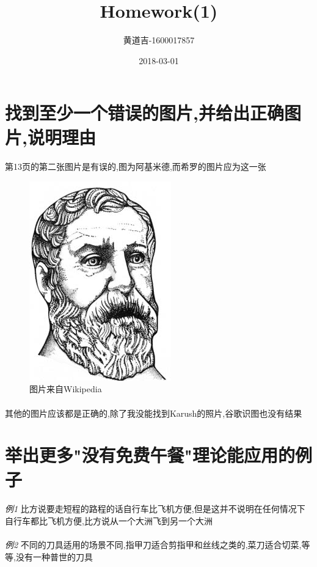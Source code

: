 \documentclass{article}
\title{Homework(1)}
\date{2018-03-01}
\author{
  \begin{CJK}{UTF8}{gbsn}
    黄道吉-1600017857
  \end{CJK}
}
\begin{document}
\begin{CJK}{UTF8}{gbsn}

\section{找到至少一个错误的图片,并给出正确图片,说明理由}
  \paragraph{}
    第13页的第二张图片是有误的,图为阿基米德,而希罗的图片应为这一张
    \begin{figure}[ht]
      \centering
      \includegraphics[scale=0.4]{Hero_of_Alexandria.png}
      \caption{图片来自Wikipedia}
      \label{fig:label}
    \end{figure}
  \paragraph{}
    其他的图片应该都是正确的,除了我没能找到Karush的照片,谷歌识图也没有结果

\section{举出更多"没有免费午餐"理论能应用的例子}
  \paragraph{}
    \textit{例1} 比方说要走短程的路程的话自行车比飞机方便,但是这并不说明在任何情况下自行车都比飞机方便,比方说从一个大洲飞到另一个大洲
  \paragraph{}
    \textit{例2} 不同的刀具适用的场景不同,指甲刀适合剪指甲和丝线之类的,菜刀适合切菜,等等,没有一种普世的刀具
\end{CJK}
\end{document}
